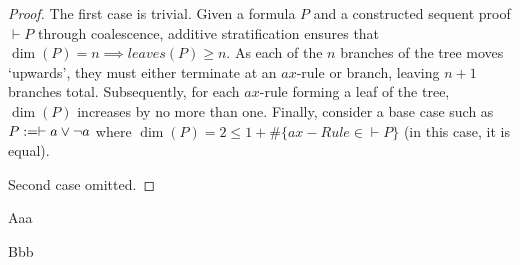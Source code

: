     \begin{proof}
        The first case is trivial.
        Given a formula $P$ and a constructed sequent proof $\vdash P$ through coalescence, additive stratification ensures that $\dim(P) = n \implies leaves(P) \geq n$.
        As each of the $n$ branches of the tree moves `upwards', they must either terminate at an $ax$-rule or branch, leaving $n + 1$ branches total.
        Subsequently, for each $ax$-rule forming a leaf of the tree, $\dim(P)$ increases by no more than one.
        Finally, consider a base case such as $P := \vdash a \vee \neg a$ where $\dim(P) = 2 \leq 1 + \#\{ax-Rule \in \vdash P\}$ (in this case, it is equal).
        
        Second case omitted. %
    \end{proof}


    \begin{remark*}
        Aaa
    \end{remark*} 

    \begin{definition*}
        Bbb
    \end{definition*}
